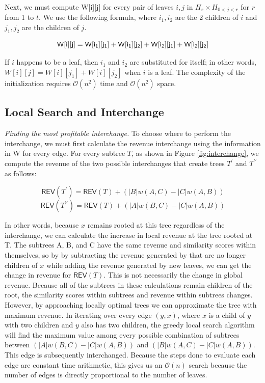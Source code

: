 \documentclass[unnumsec,webpdf,contemporary,large,numbered]{oup-authoring-template}%
\theoremstyle{thmstyleone}%
\theoremstyle{thmstyletwo}%
\theoremstyle{thmstylethree}%
\newcommand\REV{\mathsf{REV}}
\begin{document}
Next, we must compute {\sf W[i][j]} for every pair of leaves $i,j$ in $H_r \times H_{0<j<r}$ for $r$ from 1 to $t$. We use the following formula, where $i_1, i_2$ are the 2 children of $i$ and $j_1, j_2$ are the children of $j$. 

\[
{\sf W[i][j] = W[i_1][j_1] + W[i_1][j_2] + W[i_2][j_1] + W[i_2][j_2]}
\]

If $i$ happens to be a leaf, then $i_1$ and $i_2$ are substituted for itself; in other words, $W[i][j] = W[i][j_1]+W[i][j_2]$ when $i$ is a leaf. The complexity of the initialization requires $\mathcal{O}(n^2)$ time and $\mathcal{O}(n^2)$ space. 


\subsection{Local Search and Interchange}
\textit{Finding the most profitable interchange.}
To choose where to perform the interchange, we must first calculate the revenue interchange using the information in {\sf W} for every edge. For every subtree $T$, as shown in Figure \ref{fig:interchange}, we compute the revenue of the two possible interchanges that create trees $T^\prime$ and $T^{\prime\prime}$ as follows:

\[
\REV(T^{\prime}) = \REV(T) + (|B|w(A,C)- |C|w(A,B))
\]
\[
\REV(T^{\prime\prime})=\REV(T) + (|A|w(B,C) - |C|w(A,B))
\]

In other words, because $x$ remains rooted at this tree regardless of the interchange, we can calculate the increase in local revenue at the tree rooted at T. The subtrees A, B, and C have the same revenue and similarity scores within themselves, so by by subtracting the revenue generated by  that are no longer children of $x$ while adding the revenue generated by new leaves, we can get the change in revenue for $\REV(T)$. This is not necessarily the change in global revenue. Because all of the subtrees in these calculations remain children of the root, the similarity scores within subtrees and revenue within subtrees changes. However, by approaching locally optimal trees we can approximate the tree with maximum revenue. In iterating over every edge $(y, x)$, where $x$ is a child of $y$ with two children and $y$ also has two children, the greedy local search algorithm will find the maximum value among every possible combination of subtrees between $(|A|w(B,C) - |C|w(A,B))$ and $(|B|w(A,C)- |C|w(A,B))$. This edge is subsequently interchanged. Because the steps done to evaluate each edge are constant time arithmetic, this gives us an $\mathcal{O}(n)$ search because the number of edges is directly proportional to the number of leaves.
\end{document}
